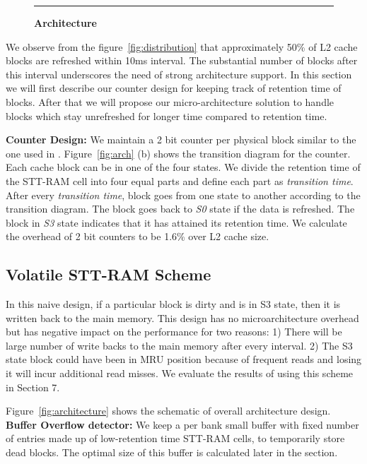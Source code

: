 


\begin{figure*} [t]
\centering
 \hrule
 \caption{\label{fig:cdf} \scriptsize \bf Architecture}
\end{figure*}


We observe from the figure~\ref{fig:distribution} that approximately 50\% of L2 cache blocks are refreshed within 10ms interval. The substantial number of blocks after this interval underscores the need of strong architecture support. In this section we will first describe our counter design for keeping track of retention time of blocks. After that we will propose our micro-architecture solution to handle blocks which stay unrefreshed for longer time compared to retention time. 

\noindent\textbf{Counter Design:}
We maintain a 2 bit counter per physical block similar to the one used in \cite{marget}. Figure~\ref{fig:arch} (b) shows the transition diagram for the counter. Each cache block can be in one of the four states. We divide the retention time of the STT-RAM cell into four equal parts and define each part as {\it transition time}. After every {\it transition time}, block goes from one state to another according to the transition diagram. The block goes back to {\it S0} state if the data is refreshed. The block in {\it S3} state indicates that it has attained its retention time. We calculate the overhead of 2 bit counters to be 1.6\% over L2 cache size.

\subsection{{Volatile STT-RAM Scheme}}
In this naive design, if a particular block is dirty and is in S3 state, then it is written back to the main memory. This design has no microarchitecture overhead but has negative impact on the performance for two reasons: 1) There will be large number of write backs to the main memory after every interval. 2) The S3 state block could have been in MRU position because of frequent reads and losing it will incur additional read misses. We evaluate the results of using this scheme in Section 7.

Figure~\ref{fig:architecture} shows the schematic of overall architecture design. 
\noindent\textbf{Buffer Overflow detector:}
We keep a per bank small buffer with fixed number of entries made up of low-retention time STT-RAM cells, to temporarily store dead blocks. The optimal size of this buffer is calculated later in the section.

